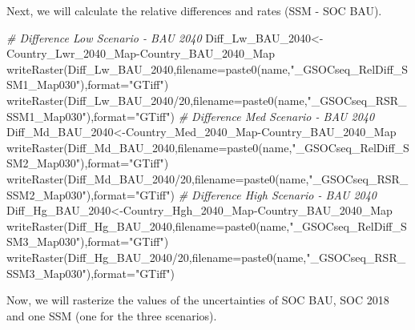 \documentclass[
  10pt,
  b5paper,
]{book}
\newenvironment{Shaded}{\begin{snugshade}}{\end{snugshade}}
\newcommand{\AttributeTok}[1]{\textcolor[rgb]{0.77,0.63,0.00}{#1}}
\newcommand{\CommentTok}[1]{\textcolor[rgb]{0.56,0.35,0.01}{\textit{#1}}}
\newcommand{\DecValTok}[1]{\textcolor[rgb]{0.00,0.00,0.81}{#1}}
\newcommand{\FunctionTok}[1]{\textcolor[rgb]{0.00,0.00,0.00}{#1}}
\newcommand{\NormalTok}[1]{#1}
\newcommand{\OtherTok}[1]{\textcolor[rgb]{0.56,0.35,0.01}{#1}}
\newcommand{\SpecialCharTok}[1]{\textcolor[rgb]{0.00,0.00,0.00}{#1}}
\newcommand{\StringTok}[1]{\textcolor[rgb]{0.31,0.60,0.02}{#1}}
\begin{document}
Next, we will calculate the relative differences and rates (SSM - SOC BAU).

\begin{Shaded}
\begin{Highlighting}[]
\CommentTok{\# Difference Low Scenario {-} BAU 2040}
\NormalTok{Diff\_Lw\_BAU\_2040}\OtherTok{\textless{}{-}}\NormalTok{Country\_Lwr\_2040\_Map}\SpecialCharTok{{-}}\NormalTok{Country\_BAU\_2040\_Map}
\FunctionTok{writeRaster}\NormalTok{(Diff\_Lw\_BAU\_2040,}\AttributeTok{filename=}\FunctionTok{paste0}\NormalTok{(name,}\StringTok{"\_GSOCseq\_RelDiff\_SSM1\_Map030"}\NormalTok{),}\AttributeTok{format=}\StringTok{"GTiff"}\NormalTok{)}
\FunctionTok{writeRaster}\NormalTok{(Diff\_Lw\_BAU\_2040}\SpecialCharTok{/}\DecValTok{20}\NormalTok{,}\AttributeTok{filename=}\FunctionTok{paste0}\NormalTok{(name,}\StringTok{"\_GSOCseq\_RSR\_SSM1\_Map030"}\NormalTok{),}\AttributeTok{format=}\StringTok{"GTiff"}\NormalTok{)}
\CommentTok{\# Difference Med Scenario {-} BAU 2040}
\NormalTok{Diff\_Md\_BAU\_2040}\OtherTok{\textless{}{-}}\NormalTok{Country\_Med\_2040\_Map}\SpecialCharTok{{-}}\NormalTok{Country\_BAU\_2040\_Map}
\FunctionTok{writeRaster}\NormalTok{(Diff\_Md\_BAU\_2040,}\AttributeTok{filename=}\FunctionTok{paste0}\NormalTok{(name,}\StringTok{"\_GSOCseq\_RelDiff\_SSM2\_Map030"}\NormalTok{),}\AttributeTok{format=}\StringTok{"GTiff"}\NormalTok{)}
\FunctionTok{writeRaster}\NormalTok{(Diff\_Md\_BAU\_2040}\SpecialCharTok{/}\DecValTok{20}\NormalTok{,}\AttributeTok{filename=}\FunctionTok{paste0}\NormalTok{(name,}\StringTok{"\_GSOCseq\_RSR\_SSM2\_Map030"}\NormalTok{),}\AttributeTok{format=}\StringTok{"GTiff"}\NormalTok{)}
\CommentTok{\# Difference High Scenario {-} BAU 2040}
\NormalTok{Diff\_Hg\_BAU\_2040}\OtherTok{\textless{}{-}}\NormalTok{Country\_Hgh\_2040\_Map}\SpecialCharTok{{-}}\NormalTok{Country\_BAU\_2040\_Map}
\FunctionTok{writeRaster}\NormalTok{(Diff\_Hg\_BAU\_2040,}\AttributeTok{filename=}\FunctionTok{paste0}\NormalTok{(name,}\StringTok{"\_GSOCseq\_RelDiff\_SSM3\_Map030"}\NormalTok{),}\AttributeTok{format=}\StringTok{"GTiff"}\NormalTok{)}
\FunctionTok{writeRaster}\NormalTok{(Diff\_Hg\_BAU\_2040}\SpecialCharTok{/}\DecValTok{20}\NormalTok{,}\AttributeTok{filename=}\FunctionTok{paste0}\NormalTok{(name,}\StringTok{"\_GSOCseq\_RSR\_SSM3\_Map030"}\NormalTok{),}\AttributeTok{format=}\StringTok{"GTiff"}\NormalTok{)}
\end{Highlighting}
\end{Shaded}

Now, we will rasterize the values of the uncertainties of SOC BAU, SOC 2018 and one SSM (one for the three scenarios).
\end{document}

